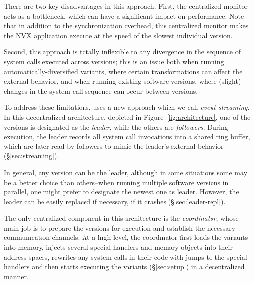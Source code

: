 There are two key disadvantages in this approach.  First, the
centralized monitor acts as a bottleneck, which can have a significant
impact on performance.  Note that in addition to the synchronization
overhead, this centralized monitor makes the NVX application execute
at the speed of the slowest individual version.

Second, this approach is totally inflexible to any divergence in the
sequence of system calls executed across versions; this is an issue
both when running automatically-diversified variants, where certain
transformations can affect the external behavior, and when running
existing software versions, where (slight) changes in the system call
sequence can occur between versions. %

To address these limitations, \nx uses a new approach which we call
\emph{event streaming}.  In this decentralized architecture,
depicted in Figure~\ref{fig:architecture}, one of the
versions is designated as the \textit{leader}, while the others are
\textit{followers}. During execution, the leader records all system
call invocations into a shared ring buffer, which are later read by
followers to mimic the leader's external behavior
(\S\ref{sec:streaming}).

In general, any version can be the leader, although in some situations
some may be a better choice than others--\eg when running multiple
software versions in parallel, one might prefer to designate the
newest one as leader.  However, the leader can be easily replaced if
necessary, \eg if it crashes (\S\ref{sec:leader-repl}).

The only centralized component in this architecture is the
\textit{coordinator}, whose main job is to prepare the versions for
execution and establish the necessary communication channels.  At a
high level, the coordinator first loads the variants into memory,
injects several special handlers and memory objects into their address
spaces, rewrites any system calls in their code with jumps to the
special handlers and then starts executing the variants
(\S\ref{sec:setup}) in a decentralized manner.



